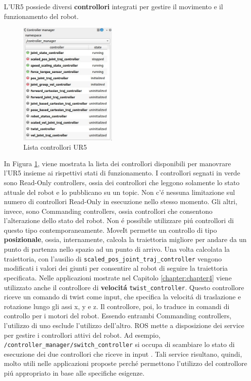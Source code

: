 L'UR5 possiede diversi \textbf{controllori} integrati per gestire il movimento e il funzionamento del robot. 
\begin{figure}[H]
    \centering
    \includegraphics*[width=0.43\textwidth]{images/controller_manager.png}
    \caption{Lista controllori UR5}
    \label{fig:controllers}
\end{figure}
In Figura \ref{fig:controllers}, viene mostrata la lista dei controllori disponibili per manovrare l'UR5 insieme ai rispettivi 
stati di funzionamento. 
I controllori segnati in verde sono Read-Only controllers, ossia dei controllori che leggono solamente lo stato attuale del 
robot e lo pubblicano su un topic. Non c'\'{e} nessuna limitazione sul numero di controllori Read-Only in esecuzione 
nello stesso momento. Gli altri, invece, sono Commanding controllers, ossia controllori che consentono l'alterazione dello 
stato del robot. Non \'{e} possibile utilizzare pi\'{u} controllori di questo tipo contemporaneamente. 
MoveIt permette un controllo di tipo \textbf{posizionale}, ossia, internamente, calcola la traiettoria migliore 
per andare da un punto di partenza nello spazio ad un punto di arrivo. 
Una volta calcolata la traiettoria, con l'ausilio di \verb|scaled_pos_joint_traj_controller| 
vengono modificati i valori dei giunti per consentire al robot di seguire la traiettoria specificata. 
Nelle applicazioni mostrate nel Capitolo \ref{chapter:chapter4} viene utilizzato anche il controllore di 
\textbf{velocit\'{a}} \verb|twist_controller|. Questo controllore riceve un comando di twist come input, 
che specifica la velocit\'{a} di traslazione e rotazione lungo gli assi x, y e z. 
Il controllore, poi, lo traduce in comandi di controllo per i motori del robot.
Essendo entrambi Commanding controllers, l'utilizzo di uno esclude l'utilizzo 
dell'altro. ROS mette a disposizione dei service per gestire i controllori attivi del robot. Ad esempio, 
\verb|/controller_manager/switch_controller| si occupa di scambiare lo stato di esecuzione dei due controllori che riceve 
in input \cite{controller_manager}. Tali service risultano, quindi, molto utili nelle applicazioni proposte perch\'{e} permettono 
l'utilizzo del controllore pi\'{u} appropriato in base alle specifiche esigenze.